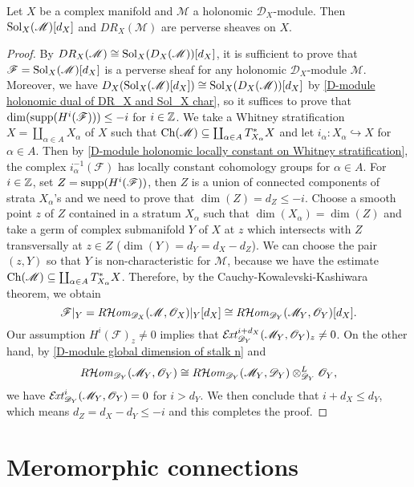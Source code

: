 \begin{theorem}\label{D-module holonomic DR_X and Sol_X perverse}
Let $X$ be a complex manifold and $\mathscr{M}$ a holonomic $\mathscr{D}_X$-module. Then $\mathrm{Sol}_X(\mathscr{M})[d_X]$ and $DR_X(\mathscr{M})$ are perverse sheaves on $X$.
\end{theorem}
\begin{proof}
By $DR_X(\mathscr{M})\cong\mathrm{Sol}_X(D_X(\mathscr{M}))[d_X]$, it is sufficient to prove that $\mathscr{F}=\mathrm{Sol}_X(\mathscr{M})[d_X]$ is a perverse sheaf for any holonomic $\mathscr{D}_X$-module $\mathscr{M}$. Moreover, we have $D_X(\mathrm{Sol}_X(\mathscr{M})[d_X])\cong\mathrm{Sol}_X(D_X(\mathscr{M}))[d_X]$ by \cref{D-module holonomic dual of DR_X and Sol_X char}, so it suffices to prove that $\dim(\mathrm{supp}(H^i(\mathscr{F})))\leq -i$ for $i\in\mathbb{Z}$. We take a Whitney stratification $X=\coprod_{\alpha\in A}X_\alpha$ of $X$ such that $\mathrm{Ch}(\mathscr{M})\subseteq\coprod_{\alpha\in A}T^*_{X_\alpha}X$ and let $i_\alpha:X_\alpha\hookrightarrow X$ for $\alpha\in A$. Then by \cref{D-module holonomic locally constant on Whitney stratification}, the complex $i_\alpha^{-1}(\mathscr{F})$ has locally constant cohomology groups for $\alpha\in A$. For $i\in\mathbb{Z}$, set $Z=\mathrm{supp}(H^i(\mathscr{F}))$, then $Z$ is a union of connected components of strata $X_\alpha$'s and we need to prove that $\dim(Z)=d_Z\leq-i$. Choose a smooth point $z$ of $Z$ contained in a stratum $X_\alpha$ such that $\dim(X_\alpha)=\dim(Z)$ and take a germ of complex submanifold $Y$ of $X$ at $z$ which intersects with $Z$ transversally at $z\in Z$ ($\dim(Y)=d_Y=d_X-d_Z$). We can choose the pair $(z,Y)$ so that $Y$ is non-characteristic for $\mathscr{M}$, because we have the estimate $\mathrm{Ch}(\mathscr{M})\subseteq\coprod_{\alpha\in A}T^*_{X_\alpha}X$. Therefore, by the Cauchy-Kowalevski-Kashiwara theorem, we obtain
\[\mathscr{F}|_Y=R\!\operatorname{\mathcal{H}\hspace*{-0.4pt}\textit{om}\hspace{0.5pt}}_{\mathscr{D}_X}(\mathscr{M},\mathscr{O}_X)|_Y[d_X]\cong R\!\operatorname{\mathcal{H}\hspace*{-0.4pt}\textit{om}\hspace{0.5pt}}_{\mathscr{D}_Y}(\mathscr{M}_Y,\mathscr{O}_Y)[d_X].\]
Our assumption $H^i(\mathscr{F})_z\neq 0$ implies that $\operatorname{\mathcal{E}\hspace*{-1.3pt}\textit{xt}\hspace{0.5pt}}_{\mathscr{D}_Y}^{i+d_X}(\mathscr{M}_Y,\mathscr{O}_Y)_z\neq 0$. On the other hand, by \cref{D-module global dimension of stalk n} and
\[R\!\operatorname{\mathcal{H}\hspace*{-0.4pt}\textit{om}\hspace{0.5pt}}_{\mathscr{D}_Y}(\mathscr{M}_Y,\mathscr{O}_Y)\cong R\!\operatorname{\mathcal{H}\hspace*{-0.4pt}\textit{om}\hspace{0.5pt}}_{\mathscr{D}_Y}(\mathscr{M}_Y,\mathscr{D}_Y)\otimes_{\mathscr{D}_Y}^L\mathscr{O}_Y,\]
we have $\operatorname{\mathcal{E}\hspace*{-1.3pt}\textit{xt}\hspace{0.5pt}}_{\mathscr{D}_Y}^i(\mathscr{M}_Y,\mathscr{O}_Y)=0$ for $i>d_Y$. We then conclude that $i+d_X\leq d_Y$, which means $d_Z=d_X-d_Y\leq -i$ and this completes the proof.
\end{proof}

\section{Meromorphic connections}
